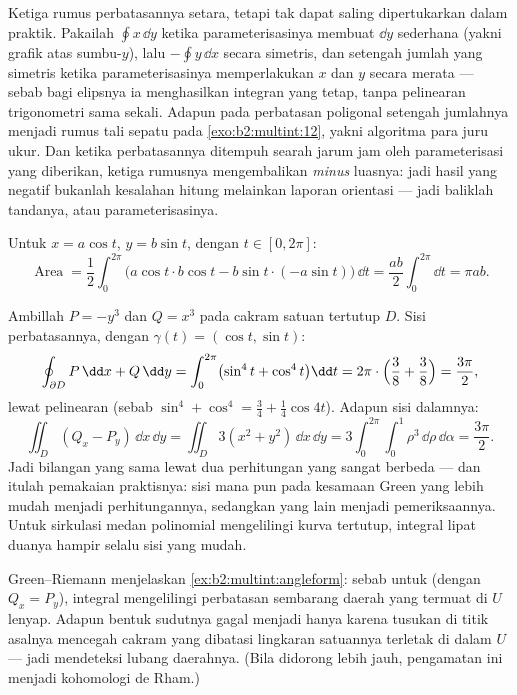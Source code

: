 \begin{remark}
Ketiga rumus perbatasannya setara, tetapi tak dapat saling dipertukarkan dalam
praktik. Pakailah $\oint x\,\dd y$ ketika parameterisasinya membuat
$\dd y$ sederhana (yakni grafik atas sumbu-$y$), lalu $-\oint y\,\dd x$
secara simetris, dan setengah jumlah yang simetris ketika
parameterisasinya memperlakukan $x$ dan $y$ secara merata --- sebab bagi elipsnya
ia menghasilkan integran yang tetap, tanpa pelinearan
trigonometri sama sekali. Adapun pada perbatasan poligonal setengah jumlahnya
menjadi rumus tali sepatu pada \cref{exo:b2:multint:12},
yakni algoritma para juru ukur. Dan ketika perbatasannya ditempuh
searah jarum jam oleh parameterisasi yang diberikan, ketiga rumusnya
mengembalikan \emph{minus} luasnya: jadi hasil yang negatif bukanlah
kesalahan hitung melainkan laporan orientasi --- jadi baliklah
tandanya, atau parameterisasinya.
\end{remark}

\begin{example}\label{ex:b2:multint:ellipsearea}
Untuk $x = a\cos t$, $y = b\sin t$, dengan $t \in [0, 2\pi]$:
\[
\operatorname{Area}
= \frac12\int_0^{2\pi}\bigl(a\cos t \cdot b\cos t
- b\sin t\cdot(-a\sin t)\bigr)\,\dd t
= \frac{ab}{2}\int_0^{2\pi}\dd t = \pi ab .
\]
\end{example}

\begin{example}\label{ex:b2:multint:greencheck}
Ambillah $P = -y^3$ dan $Q = x^3$ pada cakram satuan tertutup $D$.
Sisi perbatasannya, dengan $\gamma(t) = (\cos t, \sin t)$:
\[
\oint_{\partial D}P\,\dd x + Q\,\dd y
= \int_0^{2\pi}\bigl(\sin^4 t + \cos^4 t\bigr)\dd t
= 2\pi\cdot\Bigl(\frac38 + \frac38\Bigr) = \frac{3\pi}2 ,
\]
lewat pelinearan (sebab $\sin^4 + \cos^4 = \tfrac34 +
\tfrac14\cos4t$). Adapun sisi dalamnya:
\[
\iint_D(Q_x - P_y)\,\dd x\,\dd y
= \iint_D 3(x^2 + y^2)\,\dd x\,\dd y
= 3\int_0^{2\pi}\!\!\int_0^1\rho^3\,\dd\rho\,\dd\alpha
= \frac{3\pi}2 .
\]
Jadi bilangan yang sama lewat dua perhitungan yang sangat berbeda --- dan itulah
pemakaian praktisnya: sisi mana pun pada kesamaan Green yang
lebih mudah menjadi perhitungannya, sedangkan yang lain menjadi pemeriksaannya. Untuk
sirkulasi medan polinomial mengelilingi kurva tertutup,
integral lipat duanya hampir selalu sisi yang mudah.
\end{example}

\begin{remark}
Green--Riemann menjelaskan \cref{ex:b2:multint:angleform}: sebab untuk
 (dengan $Q_x = P_y$), integral mengelilingi perbatasan sembarang
daerah yang termuat di $U$ lenyap. Adapun bentuk sudutnya gagal menjadi 
hanya karena tusukan di titik asalnya mencegah cakram yang dibatasi
lingkaran satuannya terletak di dalam $U$ --- jadi 
 mendeteksi lubang daerahnya. (Bila didorong lebih jauh,
pengamatan ini menjadi kohomologi de Rham.)
\end{remark}


